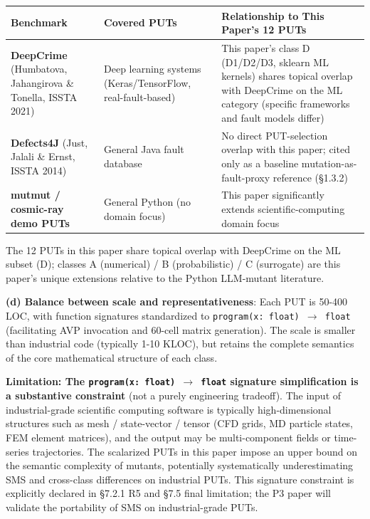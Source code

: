 \documentclass[review,12pt,authoryear]{elsarticle}
\begin{document}
{\def\LTcaptype{none} %
\begin{longtable}[]{@{}
  >{\raggedright\arraybackslash}p{}
  >{\raggedright\arraybackslash}p{}
  >{\raggedright\arraybackslash}p{}@{}}
\toprule\noalign{}
\begin{minipage}[b]{\linewidth}\raggedright
Benchmark
\end{minipage} & \begin{minipage}[b]{\linewidth}\raggedright
Covered PUTs
\end{minipage} & \begin{minipage}[b]{\linewidth}\raggedright
Relationship to This Paper's 12 PUTs
\end{minipage} \\
\midrule\noalign{}
\endhead
\bottomrule\noalign{}
\endlastfoot
\textbf{DeepCrime} (Humbatova, Jahangirova \& Tonella, ISSTA 2021) &
Deep learning systems (Keras/TensorFlow, real-fault-based) & This
paper's class D (D1/D2/D3, sklearn ML kernels) shares topical overlap
with DeepCrime on the ML category (specific frameworks and fault models
differ) \\
\textbf{Defects4J} (Just, Jalali \& Ernst, ISSTA 2014) & General Java
fault database & No direct PUT-selection overlap with this paper; cited
only as a baseline mutation-as-fault-proxy reference (§1.3.2) \\
\textbf{mutmut / cosmic-ray demo PUTs} & General Python (no domain
focus) & This paper significantly extends scientific-computing domain
focus \\
\end{longtable}
}

The 12 PUTs in this paper share topical overlap with DeepCrime on the ML
subset (D); classes A (numerical) / B (probabilistic) / C (surrogate)
are this paper's unique extensions relative to the Python LLM-mutant
literature.

\textbf{(d) Balance between scale and representativeness}: Each PUT is
50-400 LOC, with function signatures standardized to
\texttt{program(x:\ float)\ $\to$\ float} (facilitating AVP invocation and
60-cell matrix generation). The scale is smaller than industrial code
(typically 1-10 KLOC), but retains the complete semantics of the core
mathematical structure of each class.

\textbf{Limitation: The \texttt{program(x:\ float)\ $\to$\ float} signature
simplification is a substantive constraint} (not a purely engineering
tradeoff). The input of industrial-grade scientific computing software
is typically high-dimensional structures such as mesh / state-vector /
tensor (CFD grids, MD particle states, FEM element matrices), and the
output may be multi-component fields or time-series trajectories. The
scalarized PUTs in this paper impose an upper bound on the semantic
complexity of mutants, potentially systematically underestimating SMS
and cross-class differences on industrial PUTs. This signature
constraint is explicitly declared in §7.2.1 R5 and §7.5 final
limitation; the P3 paper will validate the portability of SMS on
industrial-grade PUTs.
\end{document}
